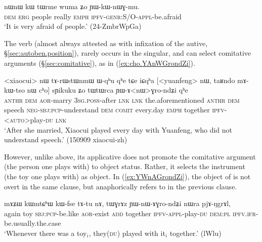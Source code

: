 \begin{exe}
\ex \label{ex:YWkWnWGmu}
\gll nɯnɯ kɯ tɯrme wuma ʑo ɲɯ-kɯ-nɯɣ-mu. \\
\textsc{dem} \textsc{erg} people really \textsc{emph} \textsc{ipfv}-\textsc{genr}:S/O-\textsc{appl}-be.afraid \\
\glt `It is very afraid of people.' (24-ZmbrWpGa)
\end{exe}

The verb  (almost always attested as  with infixation of the autive, §\ref{sec:autoben.position}), rarely occurs in the singular, and can select comitative arguments (§\ref{sec:comitative}), as in (\ref{ex:cho.YAnWGrondZi}).

\begin{exe}
\ex \label{ex:cho.YAnWGrondZi}
\gll <xiaocui> nɯ tɤ-rɯstɯnmɯ ɯ-qʰu qʰe tɕe iɕqʰa [<yuanfeng> nɯ, taʁndo mɤ-kɯ-tso nɯ cʰo] sɲikuku ʑo tɯtɯrca ɲɯ-ɤ<nɯ>ɣro-ndʑi qʰe \\
\textsc{anthr} \textsc{dem} \textsc{aor}-marry \textsc{3sg}.\textsc{poss}-after \textsc{lnk} \textsc{lnk} the.aforementioned  \textsc{anthr} \textsc{dem} speech \textsc{neg}-\textsc{sbj}:\textsc{pcp}-understand \textsc{dem} \textsc{comit} every.day \textsc{emph} together \textsc{ipfv}-<\textsc{auto}>play-\textsc{du} \textsc{lnk} \\
\glt `After she married, Xiaocui played every day with Yuanfeng, who did not understand speech.' (150909 xiaocui-zh)
\end{exe}

 However, unlike  above, its applicative  does not promote the comitative argument (the person one plays with) to object status. Rather, it selects the instrument (the toy one plays with) as object. In (\ref{ex:YWnAGrondZi}), the object of  is not overt in the same clause, but anaphorically refers to  in the previous clause.

\begin{exe}
\ex \label{ex:YWnAGrondZi}
\gll  mɤʑɯ kɯmtɕʰɯ kɯ-fse tɤ-tu nɤ, tɯɣrɤz ɲɯ-nɯ-ɤɣro-ndʑi nɯra pjɤ-ŋgrɤl,\\
again toy \textsc{sbj}:\textsc{pcp}-be.like \textsc{aor}-exist \textsc{add} together \textsc{ipfv}-\textsc{appl}-play-\textsc{du} \textsc{dem}:\textsc{pl} \textsc{ipfv}.\textsc{ifr}-be.usually.the.case \\
\glt `Whenever there was a toy$_i$, they(\textsc{du}) played with it$_i$ together.' (lWlu)
\end{exe}

